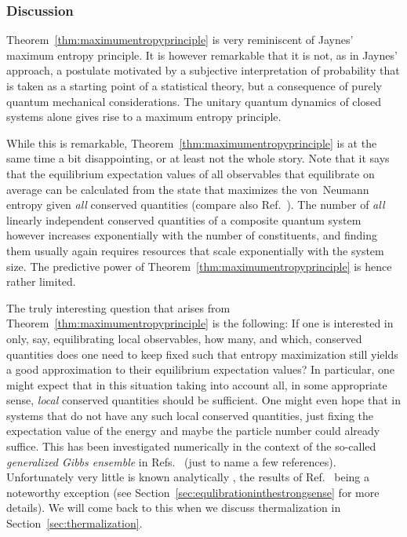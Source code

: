 \documentclass[a4paper,12pt,listof=totoc,index=totoc,bibliography=totoc,headsepline=false,headings=normal,BCOR16.153846mm,DIV12,headinclude,twoside,cleardoublepage=empty,numbers=noenddot,final]{scrreprt}
\theoremstyle{mystyle}
\numberwithin{equation}{section}
\numberwithin{figure}{section}
\numberwithin{lemma}{section}
\numberwithin{theorem}{section}
\numberwithin{corollary}{section}
\numberwithin{definition}{section}
\numberwithin{conjecture}{section}
\numberwithin{observation}{section}
\newcommand{\+}{\mkern2mu}
\DeclareMathOperator{\1}{\mathds{1}}
\begin{document}
\subsubsection*{Discussion}%
%
Theorem~\ref{thm:maximumentropyprinciple} is very reminiscent of Jaynes' maximum entropy principle.
It is however remarkable that it is not, as in Jaynes' approach, a postulate motivated by a subjective interpretation of probability that is taken as a starting point of a statistical theory, but a consequence of purely quantum mechanical considerations.
The unitary quantum dynamics of closed systems alone gives rise to a maximum entropy principle.

While this is remarkable, Theorem~\ref{thm:maximumentropyprinciple} is at the same time a bit disappointing, or at least not the whole story.
Note that it says that the equilibrium expectation values of all observables that equilibrate on average can be calculated from the state that maximizes the von~Neumann entropy given \emph{all} conserved quantities (compare also Ref.~\cite{a726f01}).
The number of \emph{all} linearly independent conserved quantities of a composite quantum system however increases exponentially with the number of constituents, and finding them usually again requires resources that scale exponentially with the system size.
The predictive power of Theorem~\ref{thm:maximumentropyprinciple} is hence rather limited.

The truly interesting question that arises from Theorem~\ref{thm:maximumentropyprinciple} is the following:
If one is interested in only, say, equilibrating local observables, how many, and which, conserved quantities does one need to keep fixed such that entropy maximization still yields a good approximation to their equilibrium expectation values?
In particular, one might expect that in this situation taking into account all, in some appropriate sense, \emph{local} conserved quantities should be sufficient.
One might even hope that in systems that do not have any such local conserved quantities, just fixing the expectation value of the energy and maybe the particle number could already suffice.
This has been investigated numerically in the context of the so-called \emph{generalized Gibbs ensemble} in Refs.~\cite{Sirker2013,1109.5904v1,Fagotti2012,Rigol08,Rigol11,1110.4690v1,Cazalilla11,Rigol07,Calabrese2007,Rigol2006,Cazalilla2006,Eckstein2008,Iucci2010,Fioretto2010,Cassidy11,1104.0154v1,Iucci2010,Fioretto2010,Iucci2009} (just to name a few references).
Unfortunately very little is known analytically \cite{1012.3587v1}, the results of Ref.~\cite{cramer10_1} being a noteworthy exception (see Section~\ref{sec:equlibrationinthestrongsense} for more details).
We will come back to this when we discuss thermalization in Section~\ref{sec:thermalization}.
\end{document}
